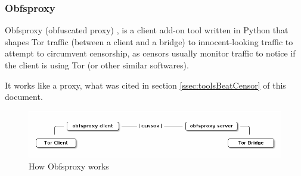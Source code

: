\subsubsection{Obfsproxy}
Obfsproxy (obfuscated proxy) \cite{Obfsproxy}, is a client add-on tool written in Python that shapes Tor traffic (between a client and a bridge) to innocent-looking traffic to attempt to circumvent censorship, as censors usually monitor traffic to notice if the client is using Tor (or other similar softwares). 

It works like a proxy, what was cited in section \ref{ssec:toolsBeatCensor} of this document.

\begin{figure}[!ht]
 \includegraphics[width=15cm]{obfsproxy_diagram}
 \caption{How Obfsproxy works}
\end{figure}